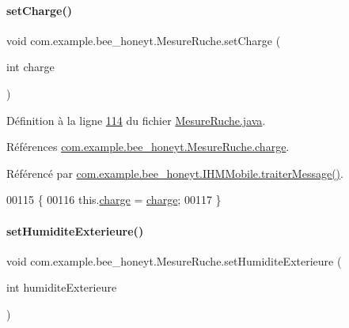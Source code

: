 \paragraph{\texorpdfstring{set\+Charge()}{setCharge()}}
{\footnotesize\ttfamily void com.\+example.\+bee\+\_\+honeyt.\+Mesure\+Ruche.\+set\+Charge (\begin{DoxyParamCaption}\item[{int}]{charge }\end{DoxyParamCaption})}



Définition à la ligne \hyperlink{_mesure_ruche_8java_source_l00114}{114} du fichier \hyperlink{_mesure_ruche_8java_source}{Mesure\+Ruche.\+java}.



Références \hyperlink{_mesure_ruche_8java_source_l00023}{com.\+example.\+bee\+\_\+honeyt.\+Mesure\+Ruche.\+charge}.



Référencé par \hyperlink{_i_h_m_mobile_8java_source_l00374}{com.\+example.\+bee\+\_\+honeyt.\+I\+H\+M\+Mobile.\+traiter\+Message()}.


\begin{DoxyCode}
00115     \{
00116         this.\hyperlink{classcom_1_1example_1_1bee__honeyt_1_1_mesure_ruche_a5ac02bc1d6195faa400e5a3171eed3f4}{charge} = \hyperlink{classcom_1_1example_1_1bee__honeyt_1_1_mesure_ruche_a5ac02bc1d6195faa400e5a3171eed3f4}{charge};
00117     \}
\end{DoxyCode}
\mbox{\label{classcom_1_1example_1_1bee__honeyt_1_1_mesure_ruche_aacb223667567aa9c8a73535f43cda985}} 
\paragraph{\texorpdfstring{set\+Humidite\+Exterieure()}{setHumiditeExterieure()}}
{\footnotesize\ttfamily void com.\+example.\+bee\+\_\+honeyt.\+Mesure\+Ruche.\+set\+Humidite\+Exterieure (\begin{DoxyParamCaption}\item[{int}]{humidite\+Exterieure }\end{DoxyParamCaption})}



